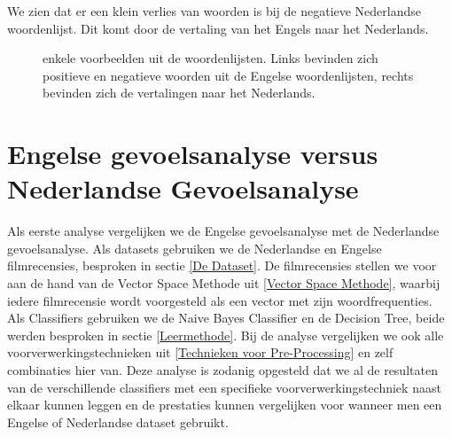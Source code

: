 We zien dat er een klein verlies van woorden is bij de negatieve Nederlandse woordenlijst. Dit komt door de vertaling van het Engels naar het Nederlands.

\begin{figure}%
    \centering
    \caption{enkele voorbeelden uit de woordenlijsten. Links bevinden zich positieve en negatieve woorden uit de Engelse woordenlijsten, rechts bevinden zich de vertalingen naar het Nederlands.}
\end{figure}

\section{Engelse gevoelsanalyse versus Nederlandse Gevoelsanalyse}\label{Engelse gevoelsanalyse versus Nederlandse Gevoelsanalyse}

Als eerste analyse vergelijken we de Engelse gevoelsanalyse met de Nederlandse gevoelsanalyse. Als datasets gebruiken we de Nederlandse en Engelse filmrecensies, besproken in sectie \ref{De Dataset}. De filmrecensies stellen we voor aan de hand van de Vector Space Methode uit \ref{Vector Space Methode}, waarbij iedere filmrecensie wordt voorgesteld als een vector met zijn woordfrequenties. Als Classifiers gebruiken we de Naive Bayes Classifier en de Decision Tree, beide werden besproken in sectie \ref{Leermethode}. Bij de analyse vergelijken we ook alle voorverwerkingstechnieken uit \ref{Technieken voor Pre-Processing} en zelf combinaties hier van. Deze analyse is zodanig opgesteld dat we al de resultaten van de verschillende classifiers met een specifieke voorverwerkingstechniek naast elkaar kunnen leggen en de prestaties kunnen vergelijken voor wanneer men een Engelse of Nederlandse dataset gebruikt.\\

